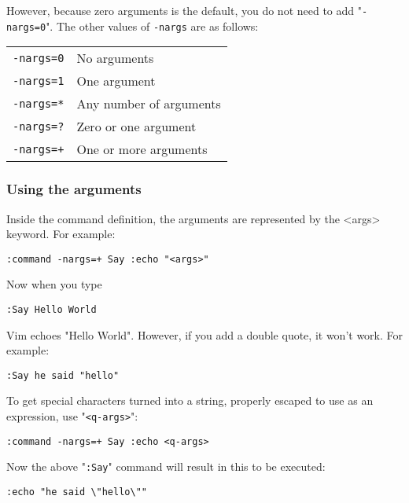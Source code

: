 However, because zero arguments is the default, you do not need to add "\texttt{-nargs=0}".
The other values of \texttt{-nargs} are as follows:

\begin{center} \begin{tabular}{c l}
				\texttt{-nargs=0} & No arguments \\
				\texttt{-nargs=1} & One argument \\
				\texttt{-nargs=*} & Any number of arguments \\
				\texttt{-nargs=?} & Zero or one argument \\
				\texttt{-nargs=+} & One or more arguments \\
\end{tabular} \end{center}

\subsubsection{Using the arguments}
Inside the command definition, the arguments are represented by the <args> keyword.
For example:

\begin{Verbatim}[samepage=true]
 :command -nargs=+ Say :echo "<args>"
\end{Verbatim}

Now when you type

\begin{Verbatim}[samepage=true]
 :Say Hello World
\end{Verbatim}

Vim echoes "Hello World".
However, if you add a double quote, it won't work.
For example:

\begin{Verbatim}[samepage=true]
 :Say he said "hello"
\end{Verbatim}

To get special characters turned into a string, properly escaped to use as an expression, use "\texttt{<q-args>}":

\begin{Verbatim}[samepage=true]
 :command -nargs=+ Say :echo <q-args>
\end{Verbatim}

Now the above "\texttt{:Say}" command will result in this to be executed:

\begin{Verbatim}[samepage=true]
 :echo "he said \"hello\""
\end{Verbatim}

